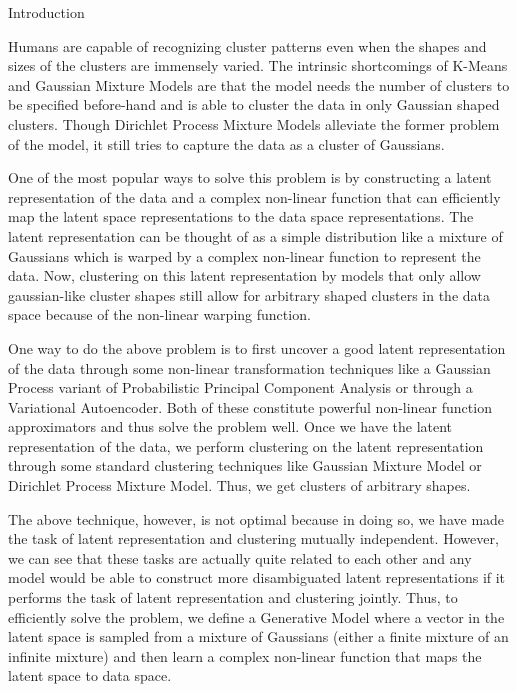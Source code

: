 \documentclass{article}
\begin{document}
\begin{psection}{Introduction}

	Humans are capable of recognizing cluster patterns even when the shapes and sizes of the clusters are immensely varied. The intrinsic shortcomings of K-Means and Gaussian Mixture Models are that the model needs the number of clusters to be specified before-hand and is able to cluster the data in only Gaussian shaped clusters. Though Dirichlet Process Mixture Models alleviate the former problem of the model, it still tries to capture the data as a cluster of Gaussians.

	One of the most popular ways to solve this problem is by constructing a latent representation of the data and a complex non-linear function that can efficiently map the latent space representations to the data space representations. The latent representation can be thought of as a simple distribution like a mixture of Gaussians which is warped by a complex non-linear function to represent the data. Now, clustering on this latent representation by models that only allow gaussian-like cluster shapes still allow for arbitrary shaped clusters in the data space because of the non-linear warping function.

	One way to do the above problem is to first uncover a good latent representation of the data through some non-linear transformation techniques like a Gaussian Process variant of Probabilistic Principal Component Analysis or through a Variational Autoencoder. Both of these constitute powerful non-linear function approximators and thus solve the problem well. Once we have the latent representation of the data, we perform clustering on the latent representation through some standard clustering techniques like Gaussian Mixture Model or Dirichlet Process Mixture Model. Thus, we get clusters of arbitrary shapes.

	The above technique, however, is not optimal because in doing so, we have made the task of latent representation and clustering mutually independent. However, we can see that these tasks are actually quite related to each other and any model would be able to construct more disambiguated latent representations if it performs the task of latent representation and clustering jointly. Thus, to efficiently solve the problem, we define a Generative Model where a vector in the latent space is sampled from a mixture of Gaussians (either a finite mixture of an infinite mixture) and then learn a complex non-linear function that maps the latent space to data space.

\end{psection}
\end{document}
